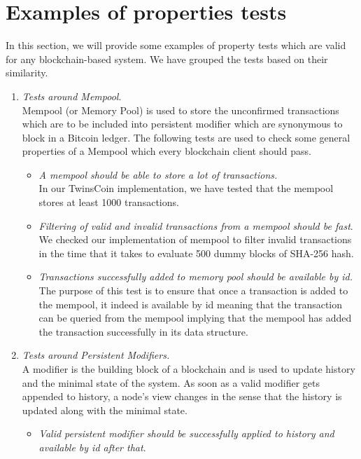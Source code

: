 
\section{Examples of properties tests}
In this section, we will provide some examples of property tests which are valid for any blockchain-based system. We have grouped the tests based on their similarity.
\begin{enumerate}[\IEEEsetlabelwidth{Z}]
\item \textit{Tests around Mempool}.\\
Mempool (or Memory Pool) is used to store the unconfirmed transactions which are to be included into persistent modifier which are synonymous to block in a Bitcoin ledger. The following tests are used to check some general properties of a Mempool which every blockchain client should pass.
\begin{itemize}[]
\item \textit{A mempool should be able to store a lot of transactions.}\\
In our TwinsCoin implementation, we have tested that the mempool stores at least 1000 transactions.
\item \textit{Filtering of valid and invalid transactions from a mempool should be fast}.\\
We checked our implementation of mempool to filter invalid transactions in the time that it takes to evaluate 500 dummy blocks of SHA-256 hash.
\item \textit{Transactions successfully added to memory pool should be available by id.}\\
The purpose of this test is to ensure that once a transaction is added to the mempool, it indeed is available by id meaning that the transaction can be queried from the mempool implying that the mempool has added the transaction successfully in its data structure.
\end{itemize}
\item \textit{Tests around Persistent Modifiers.}\\
A modifier is the building block of a blockchain and is used to update history and the minimal state of the system. As soon as a valid modifier gets appended to history, a node's view changes in the sense that the history is updated along with the minimal state.
\begin{itemize}[]
\item \textit{Valid persistent modifier should be successfully applied to history and available by id after that}.\\

\end{itemize}
\end{enumerate}
